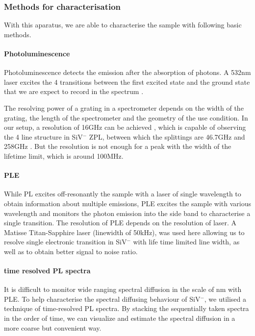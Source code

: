\subsubsection{Methods for characterisation} 
With this aparatus, we are able to characterise the sample with following basic methods.


\paragraph{Photoluminescence} 
Photoluminescence detects the emission after the absorption of photons. A 532nm laser excites the 4 transitions between the first excited state and the ground state that we are expect to record in the spectrum .

The resolving power of a grating in a spectrometer depends on the width of the grating, the length of the spectrometer and the geometry of the use condition. In our setup, a resolution of 16GHz can be achieved \cite{dietrich_isotopically_2014,rogers_all-optical_2014}, which is capable of observing the 4 line structure in SiV$^{-}$ ZPL, between which the splittings are 46.7GHz and 258GHz \citep{rogers_all-optical_2014}. But the resolution is not enough for a peak with the width of the lifetime limit, which is around 100MHz. 

\paragraph{PLE} While PL excites off-resonantly the sample with a laser of single wavelength to obtain information about multiple emissions, PLE excites the sample with various wavelength and monitors the photon emission into the side band to characterise a single transition. The resolution of PLE depends on the resolution of laser. A Matisse Titan-Sapphire laser (linewidth of 50kHz), was used here allowing us to resolve single electronic transition in SiV$^{-}$ with life time limited line width, as well as to obtain better signal to noise ratio. 

\paragraph{time resolved PL spectra} It is difficult to monitor wide ranging spectral diffusion in the scale of nm with PLE. To help characterise the spectral diffusing behaviour of SiV$^{-}$, we utilised a technique of time-resolved PL spectra. By stacking the sequentially taken spectra in the order of time, we can visualize and estimate the spectral diffusion in a more coarse but convenient way. 
 
